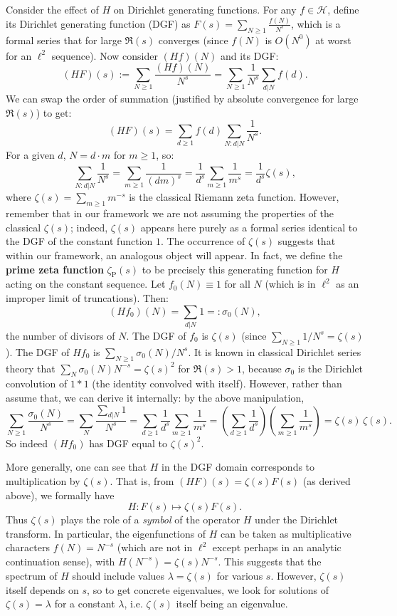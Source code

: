 \documentclass[11pt]{article}
\begin{document}
Consider the effect of $H$ on Dirichlet generating functions. For any $f \in \mathcal{H}$, define its Dirichlet generating function (DGF) as $F(s) = \sum_{N\ge1} \frac{f(N)}{N^s}$, which is a formal series that for large $\Re(s)$ converges (since $f(N)$ is $O(N^0)$ at worst for an $\ell^2$ sequence). Now consider $(Hf)(N)$ and its DGF:
\[ (HF)(s) := \sum_{N\ge1} \frac{(Hf)(N)}{N^s} = \sum_{N\ge1} \frac{1}{N^s} \sum_{d|N} f(d). \]
We can swap the order of summation (justified by absolute convergence for large $\Re(s)$) to get:
\[ (HF)(s) = \sum_{d\ge1} f(d) \sum_{N: d|N} \frac{1}{N^s}. \]
For a given $d$, $N = d \cdot m$ for $m\ge1$, so:
\[ \sum_{N: d|N} \frac{1}{N^s} = \sum_{m\ge1} \frac{1}{(dm)^s} = \frac{1}{d^s} \sum_{m\ge1} \frac{1}{m^s} = \frac{1}{d^s} \zeta(s), \]
where $\zeta(s) = \sum_{m\ge1} m^{-s}$ is the classical Riemann zeta function. However, remember that in our framework we are not assuming the properties of the classical $\zeta(s)$; indeed, $\zeta(s)$ appears here purely as a formal series identical to the DGF of the constant function $1$. The occurrence of $\zeta(s)$ suggests that within our framework, an analogous object will appear. In fact, we define the \textbf{prime zeta function} $\zeta_{\mathrm{P}}(s)$ to be precisely this generating function for $H$ acting on the constant sequence. Let $f_0(N) \equiv 1$ for all $N$ (which is in $\ell^2$ as an improper limit of truncations). Then:
\[ (H f_0)(N) = \sum_{d|N} 1 =: \sigma_0(N), \] 
the number of divisors of $N$. The DGF of $f_0$ is $\zeta(s)$ (since $\sum_{N\ge1} 1/N^s = \zeta(s)$). The DGF of $Hf_0$ is $\sum_{N\ge1} \sigma_0(N)/N^s$. It is known in classical Dirichlet series theory that $\sum_{N} \sigma_0(N) N^{-s} = \zeta(s)^2$ for $\Re(s)>1$, because $\sigma_0$ is the Dirichlet convolution of $1*1$ (the identity convolved with itself). However, rather than assume that, we can derive it internally: by the above manipulation,
\[ \sum_{N\ge1} \frac{\sigma_0(N)}{N^s} = \sum_{N} \frac{\sum_{d|N} 1}{N^s} = \sum_{d\ge1} \frac{1}{d^s} \sum_{m\ge1} \frac{1}{m^s} = \left(\sum_{d\ge1} \frac{1}{d^s}\right)\left(\sum_{m\ge1} \frac{1}{m^s}\right) = \zeta(s)\,\zeta(s). \]
So indeed $(Hf_0)$ has DGF equal to $\zeta(s)^2$.

More generally, one can see that $H$ in the DGF domain corresponds to multiplication by $\zeta(s)$. That is, from $ (HF)(s) = \zeta(s) F(s)$ (as derived above), we formally have
\[ H: F(s) \mapsto \zeta(s) F(s). \]
Thus $\zeta(s)$ plays the role of a \emph{symbol} of the operator $H$ under the Dirichlet transform. In particular, the eigenfunctions of $H$ can be taken as multiplicative characters $f(N) = N^{-s}$ (which are not in $\ell^2$ except perhaps in an analytic continuation sense), with $H (N^{-s}) = \zeta(s) N^{-s}$. This suggests that the spectrum of $H$ should include values $\lambda = \zeta(s)$ for various $s$. However, $\zeta(s)$ itself depends on $s$, so to get concrete eigenvalues, we look for solutions of $\zeta(s) = \lambda$ for a constant $\lambda$, i.e. $\zeta(s)$ itself being an eigenvalue.
\end{document}
